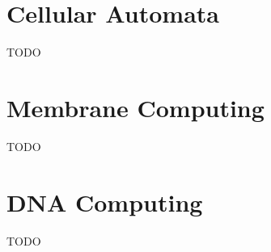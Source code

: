 \documentclass[a4paper]{article}
\begin{document}
\section{Cellular Automata}
\label{sec:ca}

TODO

\section{Membrane Computing}
\label{sec:membrane}

TODO

\section{DNA Computing}
\label{sec:dna}

TODO
\end{document}
